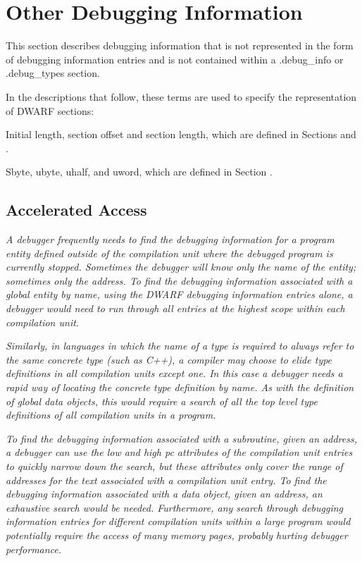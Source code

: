 \chapter{Other Debugging Information}
\label{chap:otherdebugginginformation}
This section describes debugging information that is not
represented in the form of debugging information entries and
is not contained within a .debug\_info or .debug\_types section.

In the descriptions that follow, these terms are used to
specify the representation of DWARF sections:

Initial length, section offset and section length, which are
defined in 
Sections  and 
.

Sbyte, ubyte, uhalf, and uword, which are defined in 
Section .

\section{Accelerated Access}
\label{chap:acceleratedaccess}

\textit{A debugger frequently needs to find the debugging information
for a program entity defined outside of the compilation unit
where the debugged program is currently stopped. Sometimes the
debugger will know only the name of the entity; sometimes only
the address. To find the debugging information associated with
a global entity by name, using the DWARF debugging information
entries alone, a debugger would need to run through all
entries at the highest scope within each compilation unit.}

\textit{Similarly, in languages in which the name of a type is
required to always refer to the same concrete type (such as
C++), a compiler may choose to elide type definitions in
all compilation units except one. In this case a debugger
needs a rapid way of locating the concrete type definition
by name. As with the definition of global data objects, this
would require a search of all the top level type definitions
of all compilation units in a program.}

\textit{To find the debugging information associated with a subroutine,
given an address, a debugger can use the low and high pc
attributes of the compilation unit entries to quickly narrow
down the search, but these attributes only cover the range
of addresses for the text associated with a compilation unit
entry. To find the debugging information associated with a
data object, given an address, an exhaustive search would be
needed. Furthermore, any search through debugging information
entries for different compilation units within a large program
would potentially require the access of many memory pages,
probably hurting debugger performance.}

